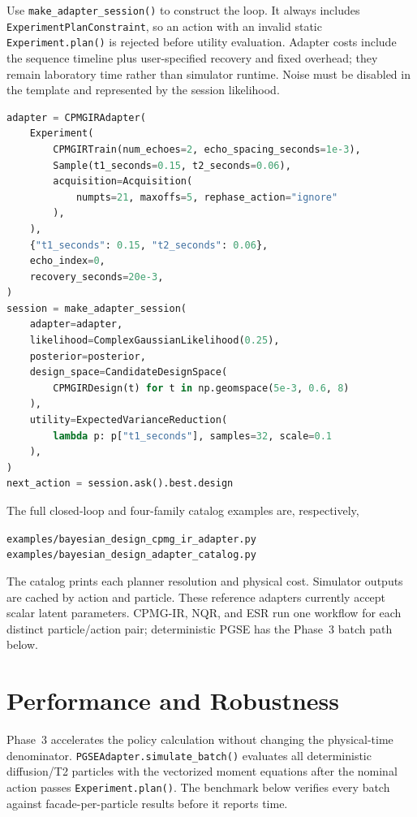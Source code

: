 \documentclass[11pt,oneside]{report}
\newcommand{\code}[1]{\texttt{#1}}
\begin{document}
Use \code{make\_adapter\_session()} to construct the loop. It always includes
\code{ExperimentPlanConstraint}, so an action with an invalid static
\code{Experiment.plan()} is rejected before utility evaluation. Adapter costs
include the sequence timeline plus user-specified recovery and fixed overhead;
they remain laboratory time rather than simulator runtime. Noise must be
disabled in the template and represented by the session likelihood.

\begin{lstlisting}[language=Python]
adapter = CPMGIRAdapter(
    Experiment(
        CPMGIRTrain(num_echoes=2, echo_spacing_seconds=1e-3),
        Sample(t1_seconds=0.15, t2_seconds=0.06),
        acquisition=Acquisition(
            numpts=21, maxoffs=5, rephase_action="ignore"
        ),
    ),
    {"t1_seconds": 0.15, "t2_seconds": 0.06},
    echo_index=0,
    recovery_seconds=20e-3,
)
session = make_adapter_session(
    adapter=adapter,
    likelihood=ComplexGaussianLikelihood(0.25),
    posterior=posterior,
    design_space=CandidateDesignSpace(
        CPMGIRDesign(t) for t in np.geomspace(5e-3, 0.6, 8)
    ),
    utility=ExpectedVarianceReduction(
        lambda p: p["t1_seconds"], samples=32, scale=0.1
    ),
)
next_action = session.ask().best.design
\end{lstlisting}

The full closed-loop and four-family catalog examples are, respectively,
\begin{center}
\code{examples/bayesian\_design\_cpmg\_ir\_adapter.py}\\
\code{examples/bayesian\_design\_adapter\_catalog.py}
\end{center}
The catalog prints each planner resolution and physical cost. Simulator outputs are cached
by action and particle. These reference adapters currently accept scalar
latent parameters. CPMG-IR, NQR, and ESR run one workflow for each distinct
particle/action pair; deterministic PGSE has the Phase~3 batch path below.

\section{Performance and Robustness}

Phase~3 accelerates the policy calculation without changing the physical-time
denominator. \code{PGSEAdapter.}\allowbreak\code{simulate\_batch()} evaluates all deterministic
diffusion/T2 particles with the vectorized moment equations after the nominal
action passes \code{Experiment.plan()}. The benchmark below verifies every
batch against facade-per-particle results before it reports time.
\end{document}
